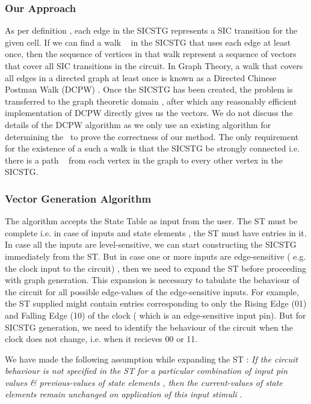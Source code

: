 \documentclass[final]{ieee}
\begin{document}
\subsubsection{Our Approach}
As per definition , each edge in the SICSTG represents a SIC transition for the given cell. If we can find a walk ~\cite{west} in the SICSTG that uses each edge at least once, then the sequence of vertices in that walk represent a sequence of vectors that cover all SIC transitions in the circuit. In Graph Theory, a walk that covers all edges in a directed graph at least once is known as a Directed Chinese Postman Walk (DCPW) . Once the SICSTG has been created, the problem is transferred to the graph theoretic domain , after which any reasonably efficient implementation of DCPW directly gives us the vectors. We do not discuss the details of the DCPW algorithm as we only use an existing algorithm for determining the ~\cite{CPP}to prove the correctness of our method. The only requirement for the existence of a such a walk is that the SICSTG be strongly connected i.e. there is a path ~\cite{west} from each vertex in the graph to every other vertex in the SICSTG. 

\subsubsection{Vector Generation Algorithm}
The algorithm accepts the State Table as input from the user. The ST must be complete i.e. in case of  inputs and  state elements , the ST must have  entries in it. In case all the inputs are level-sensitive, we can start constructing the SICSTG immediately from the ST. But in case one or more inputs are edge-sensitive ( e.g. the clock input to the circuit) , then we need to expand the ST before proceeding with graph generation. This expansion is necessary to tabulate the behaviour of the circuit for all possible edge-values of the edge-sensitive inputs. For example, the ST supplied might contain entries corresponding to only the Rising Edge (01) and Falling Edge (10) of the clock ( which is an edge-sensitive input pin). But for SICSTG generation, we need to identify the behaviour of the circuit when the clock does not change, i.e. when it recieves 00 or 11.

We have made the following assumption while expanding the ST : 
\textit{If the circuit behaviour is not specified in the ST for a particular combination of input pin values \& previous-values of state elements , then the current-values of state elements remain unchanged on application of this input stimuli }.
\end{document}
